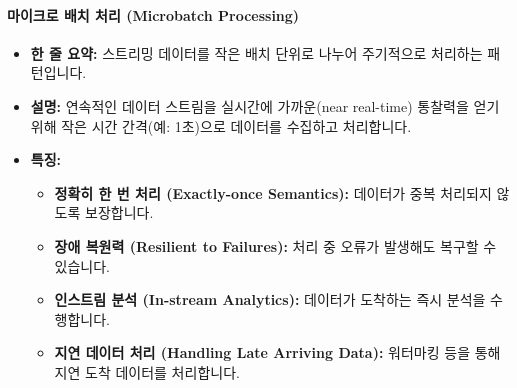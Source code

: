 \documentclass[11pt,a4paper]{article}
\begin{document}
\paragraph{마이크로 배치 처리 (Microbatch Processing)}
\begin{itemize}
    \item \textbf{한 줄 요약:} 스트리밍 데이터를 작은 배치 단위로 나누어 주기적으로 처리하는 패턴입니다.
    \item \textbf{설명:} 연속적인 데이터 스트림을 실시간에 가까운(near real-time) 통찰력을 얻기 위해 작은 시간 간격(예: 1초)으로 데이터를 수집하고 처리합니다.
    \item \textbf{특징:}
    \begin{itemize}
        \item \textbf{정확히 한 번 처리 (Exactly-once Semantics):} 데이터가 중복 처리되지 않도록 보장합니다.
        \item \textbf{장애 복원력 (Resilient to Failures):} 처리 중 오류가 발생해도 복구할 수 있습니다.
        \item \textbf{인스트림 분석 (In-stream Analytics):} 데이터가 도착하는 즉시 분석을 수행합니다.
        \item \textbf{지연 데이터 처리 (Handling Late Arriving Data):} 워터마킹 등을 통해 지연 도착 데이터를 처리합니다.
    \end{itemize}
\end{itemize}
\end{document}

